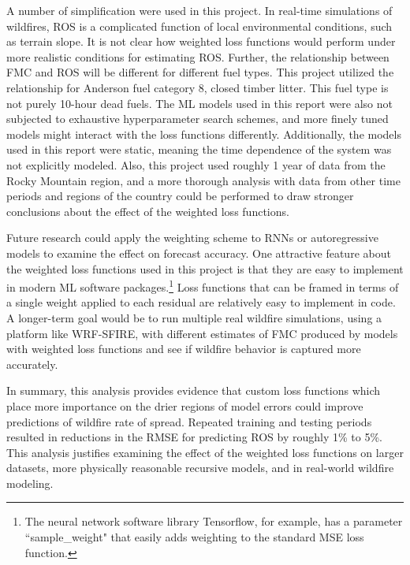 \documentclass[11pt]{article}%
\begin{document}
A number of simplification were used in this project. In real-time simulations of wildfires, ROS is a complicated function of local environmental conditions, such as terrain slope. It is not clear how weighted loss functions would perform under more realistic conditions for estimating ROS. Further, the relationship between FMC and ROS will be different for different fuel types. This project utilized the relationship for Anderson fuel category 8, closed timber litter. This fuel type is not purely 10-hour dead fuels. The ML models used in this report were also not subjected to exhaustive hyperparameter search schemes, and more finely tuned models might interact with the loss functions differently. Additionally, the models used in this report were static, meaning the time dependence of the system was not explicitly modeled. Also, this project used roughly 1 year of data from the Rocky Mountain region, and a more thorough analysis with data from other time periods and regions of the country could be performed to draw stronger conclusions about the effect of the weighted loss functions.

Future research could apply the weighting scheme to RNNs or autoregressive models to examine the effect on forecast accuracy. One attractive feature about the weighted loss functions used in this project is that they are easy to implement in modern ML software packages.\footnote{The neural network software library Tensorflow, for example, has a parameter ``sample\_weight" that easily adds weighting to the standard MSE loss function.} Loss functions that can be framed in terms of a single weight applied to each residual are relatively easy to implement in code. A longer-term goal would be to run multiple real wildfire simulations, using a platform like WRF-SFIRE, with different estimates of FMC produced by models with weighted loss functions and see if wildfire behavior is captured more accurately.

In summary, this analysis provides evidence that custom loss functions which place more importance on the drier regions of model errors could improve predictions of wildfire rate of spread. Repeated training and testing periods resulted in reductions in the RMSE for predicting ROS by roughly 1\% to 5\%. This analysis justifies examining the effect of the weighted loss functions on larger datasets, more physically reasonable recursive models, and in real-world wildfire modeling.

\newpage
% 

\begingroup
\raggedright


\endgroup
\end{document}

